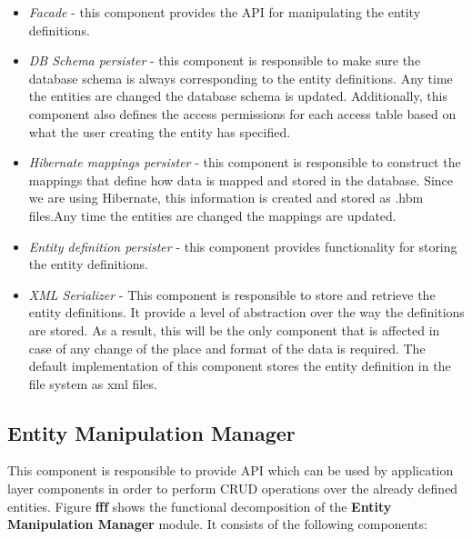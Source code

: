 \documentclass[a4paper, notitlepage]{article}
\begin{document}
\begin{itemize}
	\item \textit{Facade} - this component provides the API for manipulating the entity definitions.
	
	\item \textit{DB Schema persister} - this component is responsible to make sure the database schema is always corresponding to the entity definitions. Any time the entities are changed the database schema is updated. Additionally, this component also defines the access permissions for each access table based on what the user creating the entity has specified.
	
	\item \textit{Hibernate mappings persister} - this component is responsible to construct the mappings that define how data is mapped and stored in the database. Since we are using Hibernate, this information is created and stored as .hbm files.Any time the entities are changed the mappings are updated.
	
	\item \textit{Entity definition persister} - this component provides functionality for storing the entity definitions.
	
	\item \textit{XML Serializer} -  This component is responsible to store and retrieve the entity definitions. It provide a level of abstraction over the way the definitions are stored. As a result, this will be the only component that is affected in case of any change of the place and format of the data is required. The default implementation of this component stores the entity definition in the file system as xml files.
\end{itemize}

\subsection{Entity Manipulation Manager}

This component is responsible to provide API which can be used by application layer components in order to perform CRUD operations over the already defined entities. Figure \textbf{fff} shows the functional decomposition of the \textbf{Entity Manipulation Manager} module. It consists of the following components:
\end{document}
